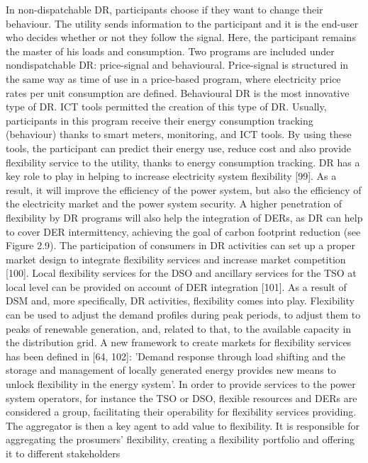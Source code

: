 In non-dispatchable DR, participants choose if they want to change their behaviour. The utility sends information to the participant and it is the end-user who decides whether or not they follow the signal. Here, the participant remains the master of his loads and consumption. Two programs are included under nondispatchable DR: price-signal and behavioural. Price-signal is structured in the same way as time of use in a price-based program, where electricity price rates per unit consumption are defined. Behavioural DR is the
most innovative type of DR. ICT tools permitted the creation of this type of DR. Usually, participants in this program receive their energy consumption tracking (behaviour) thanks to smart meters, monitoring, and ICT tools. By using these tools, the participant can predict their energy use, reduce cost and also provide flexibility service to the utility, thanks to energy consumption tracking.
DR has a key role to play in helping to increase electricity system flexibility [99]. As a result, it will improve the efficiency of the power system, but also the efficiency of the electricity market and the power system security. A higher penetration of flexibility by DR programs will also help the integration of DERs, as DR can help to cover DER intermittency, achieving the goal of carbon footprint reduction (see Figure 2.9).
The participation of consumers in DR activities can set up a proper market design to integrate flexibility services and increase market competition [100]. Local flexibility services for the DSO and ancillary services for the TSO at local level can be provided on account of DER integration [101].
As a result of DSM and, more specifically, DR activities, flexibility comes into play. Flexibility can be used to adjust the demand profiles during peak periods, to adjust them to peaks of renewable generation, and, related to that, to the available capacity in the distribution grid.
A new framework to create markets for flexibility services has been defined in [64, 102]: 'Demand response through load shifting and the storage and management of locally generated energy provides new means to unlock flexibility in the energy system'. In order to provide services to the power system operators, for instance the TSO or DSO, flexible resources and DERs are considered a group, facilitating their operability for flexibility services providing. The aggregator is then a key agent to add value to flexibility. It is responsible for aggregating the prosumers' flexibility, creating a flexibility portfolio and offering it to different stakeholders
